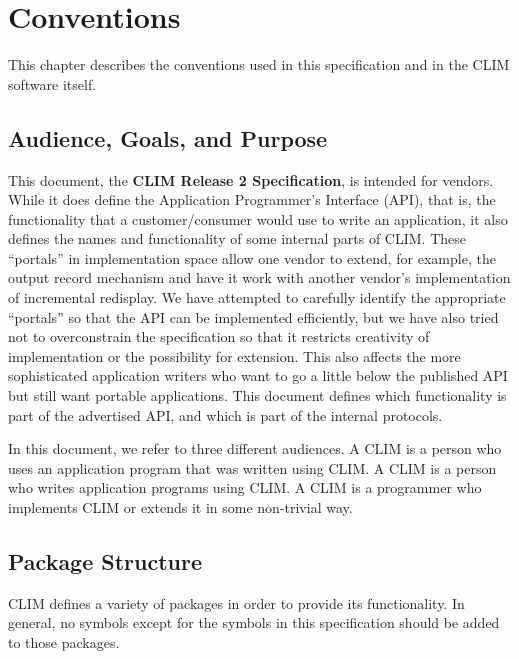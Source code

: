 
\chapter {Conventions}
\label {conventions}

This chapter describes the conventions used in this specification and in the
CLIM software itself.


\section {Audience, Goals, and Purpose}

This document, the {\bf CLIM Release 2 Specification}, is intended for vendors.
While it does define the Application Programmer's Interface (API), that is, the
functionality that a customer/consumer would use to write an application, it
also defines the names and functionality of some internal parts of CLIM.  These
``portals'' in implementation space allow one vendor to extend, for example, the
output record mechanism and have it work with another vendor's implementation of
incremental redisplay.  We have attempted to carefully identify the appropriate
``portals'' so that the API can be implemented efficiently, but we have also
tried not to overconstrain the specification so that it restricts creativity of
implementation or the possibility for extension.  This also affects the more
sophisticated application writers who want to go a little below the published
API but still want portable applications.  This document defines which
functionality is part of the advertised API, and which is part of the internal
protocols.

In this document, we refer to three different audiences.  A CLIM 
is a person who uses an application program that was written using CLIM.  A CLIM
 is a person who writes application programs using CLIM.  A
CLIM  is a programmer who implements CLIM or extends it in
some non-trivial way.


\section {Package Structure}

CLIM defines a variety of packages in order to provide its functionality.  In
general, no symbols except for the symbols in this specification should be added
to those packages.

